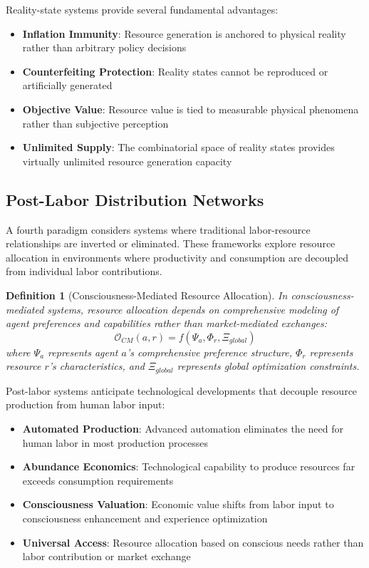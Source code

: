 \documentclass[12pt,a4paper]{article}
\newtheorem{definition}[theorem]{Definition}
\begin{document}
Reality-state systems provide several fundamental advantages:
\begin{itemize}
\item \textbf{Inflation Immunity}: Resource generation is anchored to physical reality rather than arbitrary policy decisions
\item \textbf{Counterfeiting Protection}: Reality states cannot be reproduced or artificially generated
\item \textbf{Objective Value}: Resource value is tied to measurable physical phenomena rather than subjective perception
\item \textbf{Unlimited Supply}: The combinatorial space of reality states provides virtually unlimited resource generation capacity
\end{itemize}

\subsection{Post-Labor Distribution Networks}

A fourth paradigm considers systems where traditional labor-resource relationships are inverted or eliminated. These frameworks explore resource allocation in environments where productivity and consumption are decoupled from individual labor contributions.

\begin{definition}[Consciousness-Mediated Resource Allocation]
In consciousness-mediated systems, resource allocation depends on comprehensive modeling of agent preferences and capabilities rather than market-mediated exchanges:
\begin{equation}
\mathcal{O}_{CM}(a,r) = f(\Psi_a, \Phi_r, \Xi_{global})
\end{equation}
where $\Psi_a$ represents agent $a$'s comprehensive preference structure, $\Phi_r$ represents resource $r$'s characteristics, and $\Xi_{global}$ represents global optimization constraints.
\end{definition}

Post-labor systems anticipate technological developments that decouple resource production from human labor input:
\begin{itemize}
\item \textbf{Automated Production}: Advanced automation eliminates the need for human labor in most production processes
\item \textbf{Abundance Economics}: Technological capability to produce resources far exceeds consumption requirements
\item \textbf{Consciousness Valuation}: Economic value shifts from labor input to consciousness enhancement and experience optimization
\item \textbf{Universal Access}: Resource allocation based on conscious needs rather than labor contribution or market exchange
\end{itemize}
\end{document}
